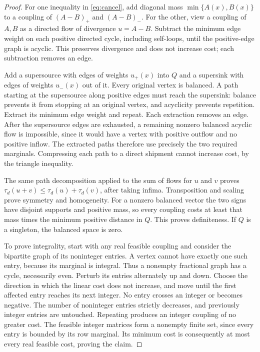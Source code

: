\documentclass[11pt]{article}
\theoremstyle{remark}
\begin{document}
\begin{proof}
For one inequality in \eqref{eq:cancel}, add diagonal mass \(\min\{A(x),B(x)\}\) to a coupling of \((A-B)_+\) and \((A-B)_-\). For the other, view a coupling of \(A,B\) as a directed flow of divergence \(u=A-B\). Subtract the minimum edge weight on each positive directed cycle, including self-loops, until the positive-edge graph is acyclic. This preserves divergence and does not increase cost; each subtraction removes an edge.

Add a supersource with edges of weights \(u_+(x)\) into \(Q\) and a supersink with edges of weights \(u_-(x)\) out of it. Every original vertex is balanced. A path starting at the supersource along positive edges must reach the supersink: balance prevents it from stopping at an original vertex, and acyclicity prevents repetition. Extract its minimum edge weight and repeat. Each extraction removes an edge. After the supersource edges are exhausted, a remaining nonzero balanced acyclic flow is impossible, since it would have a vertex with positive outflow and no positive inflow. The extracted paths therefore use precisely the two required marginals. Compressing each path to a direct shipment cannot increase cost, by the triangle inequality.

The same path decomposition applied to the sum of flows for \(u\) and \(v\) proves \(\tau_d(u+v)\le\tau_d(u)+\tau_d(v)\), after taking infima. Transposition and scaling prove symmetry and homogeneity. For a nonzero balanced vector the two signs have disjoint supports and positive mass, so every coupling costs at least that mass times the minimum positive distance in \(Q\). This proves definiteness. If \(Q\) is a singleton, the balanced space is zero.

To prove integrality, start with any real feasible coupling and consider the bipartite graph of its noninteger entries. A vertex cannot have exactly one such entry, because its marginal is integral. Thus a nonempty fractional graph has a cycle, necessarily even. Perturb its entries alternately up and down. Choose the direction in which the linear cost does not increase, and move until the first affected entry reaches its next integer. No entry crosses an integer or becomes negative. The number of noninteger entries strictly decreases, and previously integer entries are untouched. Repeating produces an integer coupling of no greater cost. The feasible integer matrices form a nonempty finite set, since every entry is bounded by its row marginal. Its minimum cost is consequently at most every real feasible cost, proving the claim.
\end{proof}
\end{document}
